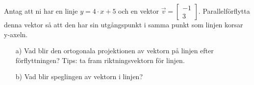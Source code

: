 Antag att ni har en linje $y = 4 \cdot x + 5$ och en vektor $\vec{v} = \begin{bmatrix} -1 \\ 3 \end{bmatrix}$. Parallelförflytta denna vektor så att den har sin utgångspunkt i samma punkt som linjen korsar y-axeln.
\begin{itemize}
\item[a) ] Vad blir den ortogonala projektionen av vektorn på linjen efter förflyttningen? Tips: ta fram riktningsvektorn för linjen. 
\item[b) ] Vad blir speglingen av vektorn i linjen?
\end{itemize}